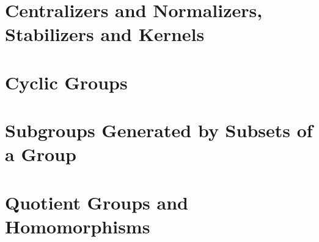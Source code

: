 \documentclass[a4paper, openany]{book}
\begin{document}
\section{Centralizers and Normalizers, Stabilizers and Kernels}

\newpage

\section{Cyclic Groups}

\newpage

\section{Subgroups Generated by Subsets of a Group}

\newpage

\section{Quotient Groups and Homomorphisms}

\newpage
\end{document}
